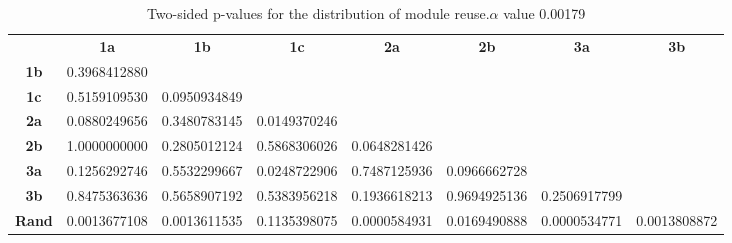 \begin{table}[h!]
    \centering
    \begin{tabular}{cccccccc}
                              & \textbf{1a}        & \textbf{1b}        & \textbf{1c}  & \textbf{2a}        & \textbf{2b}        & \textbf{3a}        & \textbf{3b}        \\
    \textbf{1b}               & 0.3968412880       &                    &              &                    &                    &                    &                    \\
    \textbf{1c}               & 0.5159109530       & 0.0950934849       &              &                    &                    &                    &                    \\
    \textbf{2a}               & 0.0880249656       & 0.3480783145       & 0.0149370246 &                    &                    &                    &                    \\
    \textbf{2b}               & 1.0000000000       & 0.2805012124       & 0.5868306026 & 0.0648281426       &                    &                    &                    \\
    \textbf{3a}               & 0.1256292746       & 0.5532299667       & 0.0248722906 & 0.7487125936       & 0.0966662728       &                    &                    \\
    \textbf{3b}               & 0.8475363636       & 0.5658907192       & 0.5383956218 & 0.1936618213       & 0.9694925136       & 0.2506917799       &                    \\
    \textbf{Rand}             & 0.0013677108       & 0.0013611535       & 0.1135398075 & 0.0000584931       & 0.0169490888       & 0.0000534771       & 0.0013808872
    \end{tabular}
    \caption{Two-sided p-values for the distribution of module reuse.\(\alpha\) value 0.00179}
    \label{tab:exp2.reuseptable}
\end{table}